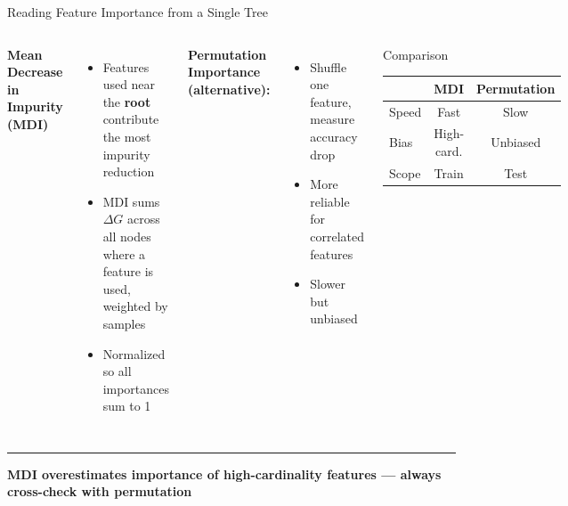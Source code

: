 \documentclass[8pt,aspectratio=169]{beamer}
\newcommand{\bottomnote}[1]{%
\vfill
\vspace{-2mm}
\textcolor{mllavender2}{\rule{\textwidth}{0.4pt}}
\vspace{1mm}
\footnotesize
\textbf{#1}
}
\newenvironment{compactlist}{%
  \begin{itemize}%
    \setlength{\itemsep}{2pt}%
    \setlength{\parskip}{0pt}%
    \setlength{\parsep}{0pt}%
}{%
  \end{itemize}%
}
\newcommand{\highlight}[1]{\textcolor{mlorange}{\textbf{#1}}}
\begin{document}
\begin{frame}[t]{Reading Feature Importance from a Single Tree}
\begin{columns}[T]
\small
\textbf{Mean Decrease in Impurity (MDI)}

\footnotesize
\begin{compactlist}
\item \footnotesize Features used near the \highlight{root} contribute the most impurity reduction
\item \footnotesize MDI sums $\Delta G$ across all nodes where a feature is used, weighted by samples
\item \footnotesize Normalized so all importances sum to 1
\end{compactlist}

\vspace{2mm}
\textbf{Permutation Importance (alternative):}
\begin{compactlist}
\item \footnotesize Shuffle one feature, measure accuracy drop
\item \footnotesize More reliable for correlated features
\item \footnotesize Slower but unbiased
\end{compactlist}

\vspace{2mm}
\begin{block}{Comparison}
\footnotesize
\begin{tabular}{lcc}
\toprule
& \textbf{MDI} & \textbf{Permutation} \\
\midrule
Speed & Fast & Slow \\
Bias & High-card. & Unbiased \\
Scope & Train & Test \\
\bottomrule
\end{tabular}
\end{block}
\end{columns}
\bottomnote{MDI overestimates importance of high-cardinality features --- always cross-check with permutation}
\end{frame}
\end{document}
